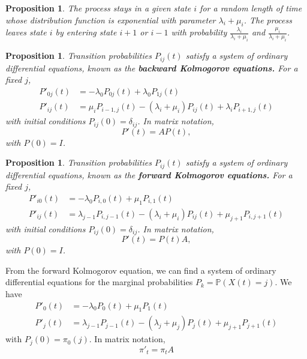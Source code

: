 \documentclass[10pt, oneside, reqno]{amsart}
\theoremstyle{plain}%
\newtheorem{prop}[thm]{Proposition}
\theoremstyle{definition}
\theoremstyle{remark}
\newcommand{\prob}[1]{\mathbb{P}(#1)}
\begin{document}
\begin{prop}
    The process stays in a given state $i$ for a random length of time whose distribution function is exponential with parameter $\lambda_i + \mu_i$.  The process leaves state $i$ by entering state $i+1$ or $i -1 $ with probability $\frac{\lambda_i}{\lambda_i + \mu_i}$ and $\frac{\mu_i}{\lambda_i + \mu_i}$.
\end{prop}

\begin{prop}
    Transition probabilities $P_{ij}(t)$ satisfy a system of ordinary differential equations, known as the \textbf{backward Kolmogorov equations.}  For a fixed $j$, 
    \begin{align*}
        P'_{0j}(t) &= -\lambda_0 P_{0j}(t) + \lambda_0 P_{1j}(t) \\
        P'_{ij}(t) &= \mu_i P_{i-1,j}(t) - (\lambda_i + \mu_i)P_{ij}(t) + \lambda_i P_{i+1,j}(t)
    \end{align*} with initial conditions $P_{ij}(0) = \delta_{ij}$.  In matrix notation, \[
        P'(t)  = AP(t),
    \] with $P(0) = I$.
\end{prop}

\begin{prop}
    Transition probabilities $P_{ij}(t)$ satisfy a system of ordinary differential equations, known as the \textbf{forward Kolmogorov equations.}  For a fixed $j$, 
    \begin{align*}
        P'_{i0}(t) &= -\lambda_0 P_{i,0}(t) + \mu_1 P_{i,1}(t) \\
        P'_{ij}(t) &= \lambda_{j-1} P_{i,j-1}(t) - (\lambda_i + \mu_i)P_{ij}(t) + \mu_{j+1} P_{i,j+1}(t)
    \end{align*} with initial conditions $P_{ij}(0) = \delta_{ij}$.  In matrix notation, \[
        P'(t)  = P(t)A,
    \] with $P(0) = I$.
\end{prop}

From the forward Kolmogorov equation, we can find a system of ordinary differential equations for the marginal probabilities $P_k = \prob{X(t) = j}$.  We have \begin{align*}
    P'_0(t) &= - \lambda_0 P_0(t) + \mu_1 P_1(t) \\
    P'_j(t) &= \lambda_{j-1}P_{j-1}(t) - (\lambda_j + \mu_j) P_j(t) + \mu_{j+1}P_{j+1}(t)
\end{align*} with $P_j(0) = \pi_0(j)$.  In matrix notation, \[
    \pi'_t = \pi_t A
\]
\clearpage
\end{document}
